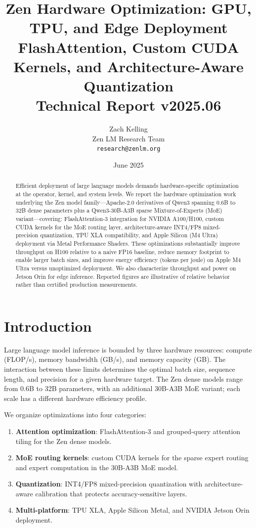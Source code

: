 \documentclass[11pt,a4paper]{article}
\title{\textbf{Zen Hardware Optimization: GPU, TPU, and Edge Deployment\\
FlashAttention, Custom CUDA Kernels, and Architecture-Aware Quantization}\\
\large Technical Report v2025.06}
\author{Zach Kelling \\ Zen LM Research Team\\
\texttt{research@zenlm.org}}
\date{June 2025}
\begin{document}
\maketitle

\begin{abstract}
Efficient deployment of large language models demands hardware-specific optimization at
the operator, kernel, and system levels. We report the hardware optimization work
underlying the Zen model family---Apache-2.0 derivatives of Qwen3 spanning 0.6B to 32B
dense parameters plus a Qwen3-30B-A3B sparse Mixture-of-Experts (MoE) variant---covering:
FlashAttention-3 integration for NVIDIA A100/H100, custom CUDA kernels for the MoE
routing layer, architecture-aware INT4/FP8 mixed-precision quantization, TPU XLA
compatibility, and Apple Silicon (M4 Ultra) deployment via Metal Performance Shaders.
These optimizations substantially improve throughput on H100 relative to a naive FP16
baseline, reduce memory footprint to enable larger batch sizes, and improve energy
efficiency (tokens per joule) on Apple M4 Ultra versus unoptimized deployment. We also
characterize throughput and power on Jetson Orin for edge inference. Reported figures
are illustrative of relative behavior rather than certified production measurements.
\end{abstract}

\tableofcontents
\newpage

\section{Introduction}
\label{sec:intro}

Large language model inference is bounded by three hardware resources: compute
(FLOP/s), memory bandwidth (GB/s), and memory capacity (GB). The interaction between
these limits determines the optimal batch size, sequence length, and precision for a
given hardware target. The Zen dense models range from 0.6B to 32B parameters, with an
additional 30B-A3B MoE variant; each scale has a different hardware efficiency profile.

We organize optimizations into four categories:

\begin{enumerate}
    \item \textbf{Attention optimization}: FlashAttention-3 \cite{shah2024flashattention3}
          and grouped-query attention tiling for the Zen dense models.
    \item \textbf{MoE routing kernels}: custom CUDA kernels for the sparse expert
          routing and expert computation in the 30B-A3B MoE model.
    \item \textbf{Quantization}: INT4/FP8 mixed-precision quantization with
          architecture-aware calibration that protects accuracy-sensitive layers.
    \item \textbf{Multi-platform}: TPU XLA, Apple Silicon Metal, and NVIDIA Jetson Orin
          deployment.
\end{enumerate}
\end{document}
